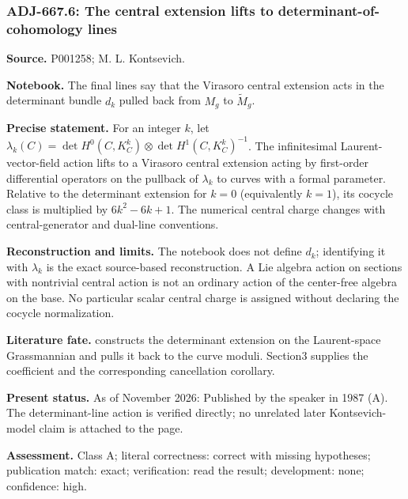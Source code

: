 \subsubsection{ADJ-667.6: The central extension lifts to determinant-of-cohomology lines}
\noindent\textbf{Source.} P001258; M. L. Kontsevich.\par
\noindent\textbf{Notebook.} The final lines say that the Virasoro central extension acts in the determinant bundle \(d_k\) pulled back from \(M_g\) to \(\widetilde M_g\).\par

\noindent\textbf{Precise statement.} For an integer \(k\), let \(\lambda_k(C)=\det H^0(C,K_C^k)\otimes\det H^1(C,K_C^k)^{-1}\). The infinitesimal Laurent-vector-field action lifts to a Virasoro central extension acting by first-order differential operators on the pullback of \(\lambda_k\) to curves with a formal parameter. Relative to the determinant extension for \(k=0\) (equivalently \(k=1\)), its cocycle class is multiplied by \(6k^2-6k+1\). The numerical central charge changes with central-generator and dual-line conventions.\par

\noindent\textbf{Reconstruction and limits.} The notebook does not define \(d_k\); identifying it with \(\lambda_k\) is the exact source-based reconstruction. A Lie algebra action on sections with nontrivial central action is not an ordinary action of the center-free algebra on the base. No particular scalar central charge is assigned without declaring the cocycle normalization.\par

\noindent\textbf{Literature fate.} \citet[\S\S2--3]{kontsevich1987virasoro} constructs the determinant extension on the Laurent-space Grassmannian and pulls it back to the curve moduli. Section3 supplies the coefficient and the corresponding cancellation corollary.\par

\noindent\textbf{Present status.} As of November 2026: Published by the speaker in 1987 (A). The determinant-line action is verified directly; no unrelated later Kontsevich-model claim is attached to the page.\par

\noindent\textbf{Assessment.} Class A; literal correctness: correct with missing hypotheses; publication match: exact; verification: read the result; development: none; confidence: high.\par

